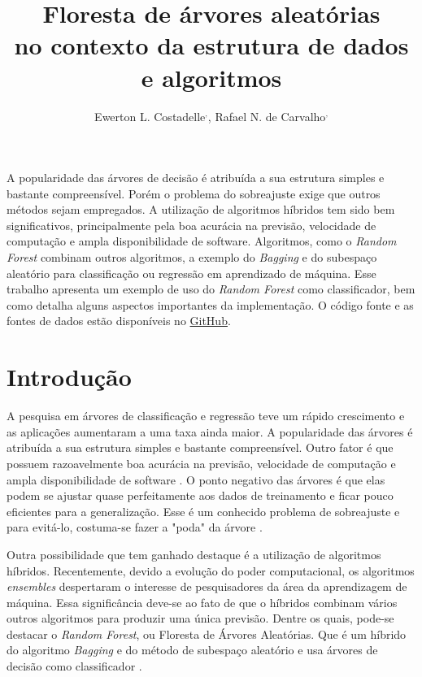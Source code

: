 \documentclass[12pt]{article}
\title{Floresta de árvores aleatórias \\ no contexto da estrutura de dados e algoritmos}
\author{Ewerton L. Costadelle\inst{1}$^{,}$\inst{2}, Rafael N. de Carvalho\inst{1}$^{,}$\inst{2}}
\begin{document}
 

\maketitle

\begin{resumo} 
  A popularidade das árvores de decisão é atribuída a sua estrutura simples e bastante compreensível. Porém o problema do sobreajuste exige que outros métodos sejam empregados. A utilização de algoritmos híbridos tem sido bem significativos, principalmente pela boa acurácia na previsão, velocidade de computação e ampla disponibilidade de software. Algoritmos, como o \emph{Random Forest} combinam outros algoritmos, a exemplo do \emph{Bagging} e do subespaço aleatório para classificação ou regressão em aprendizado de máquina. Esse trabalho apresenta um exemplo de uso do \textit{Random Forest} como classificador, bem como detalha alguns aspectos importantes da implementação. O código fonte e as fontes de dados estão disponíveis no \href{https://github.com/ecostadelle/RandomForestTex}{GitHub}.
\end{resumo}


\section{Introdução}

A pesquisa em árvores de classificação e regressão teve um rápido crescimento e as aplicações aumentaram a uma taxa ainda maior. A popularidade das árvores é atribuída a sua estrutura simples e bastante compreensível. Outro fator é que possuem razoavelmente boa acurácia na previsão, velocidade de computação e ampla disponibilidade de software \cite{Loh_2014}. O ponto negativo das árvores é que elas podem se ajustar quase perfeitamente aos dados de treinamento e ficar pouco eficientes para a generalização. Esse é um conhecido problema de sobreajuste e para evitá-lo, costuma-se fazer a "poda" da árvore \cite{Grus_2019}.

Outra possibilidade que tem ganhado destaque é a utilização de algoritmos híbridos. Recentemente, devido a evolução do poder computacional, os algoritmos \emph{ensembles} despertaram o interesse de pesquisadores da área da aprendizagem de máquina. Essa significância deve-se ao fato de que o híbridos combinam vários outros algoritmos para produzir uma única previsão. Dentre os quais, pode-se destacar o \textit{Random Forest}, ou Floresta de Árvores Aleatórias. Que é um híbrido do algoritmo \emph{Bagging} e do método de subespaço aleatório e usa árvores de decisão como classificador \cite{Buhmann_2011}.
\end{document}
